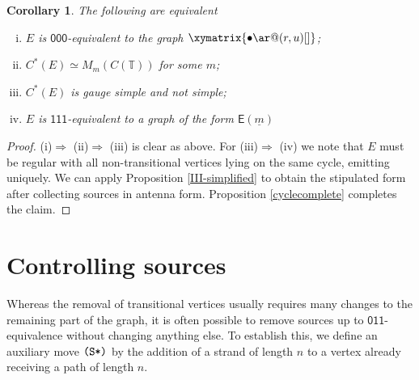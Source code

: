 \documentclass[12pt]{amsbook}%
\newtheorem{corol}[theor]{Corollary}
\theoremstyle{defin}
\theoremstyle{remark}
\numberwithin{equation}{chapter}
\numberwithin{theor}{section}
\newcommand{\TT}{\mathbb{T}}
\newcommand{\xyz}[1]{\mbox{$\mathsf{#1}$}}
\newcommand{\SSSs}{\mbox{\texttt{\textup{(S*)}}}}
\newcommand{\GC}{{\mathsf E}}
\begin{document}
\begin{corol}\label{reducetoGC}
The following are equivalent\\
\begin{enumerate}[(i)]
\item $E$ is \xyz{000}-equivalent to the graph $\xymatrix{\bullet\ar@(r,u)[]}$;
\item $C^*(E)\simeq M_m(C(\TT))$ for some $m$;
\item $C^*(E)$ is gauge simple and not simple;
\item $E$ is \xyz{111}-equivalent to a graph of the form $\GC(\underline{m})$
\end{enumerate}
\end{corol}
\begin{proof} 
(i)$\Longrightarrow$ (ii)$\Longrightarrow$ (iii) is clear as above. For (iii)$\Longrightarrow$ (iv) we note that $E$ must be regular with all non-transitional vertices lying on the same cycle, emitting uniquely. We can  apply Proposition \ref{III-simplified} to obtain the stipulated form after collecting  sources in antenna form. Proposition \ref{cyclecomplete} completes the claim.
\end{proof}

\section{Controlling sources}

Whereas the removal of transitional vertices usually requires many changes to the remaining part of the graph, it is often possible to remove sources up to \xyz{011}-equivalence without changing anything else. To establish this, we define an auxiliary move  $\SSSs$ by the addition of a strand of length $n$ to a vertex already receiving a path of length $n$. \index{Ss@$\SSSs$}
\end{document}
